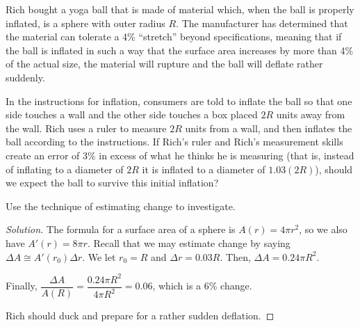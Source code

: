 \question Rich bought a yoga ball that is made of material which,
when the ball is properly inflated, is a sphere with outer radius $R$.
The manufacturer has determined that the material can tolerate a 4\% ``stretch'' beyond specifications,
meaning that if the ball is inflated in such a way that the surface area increases by more than 4\%
of the actual size, the material will rupture and the ball will deflate rather suddenly.

In the instructions for inflation, consumers are told to inflate the ball
so that one side touches a wall and the other side touches a box placed $2R$ units away from the wall.
Rich uses a ruler to measure $2R$ units from a wall, and then inflates the ball according to the instructions.
If Rich's ruler and Rich's measurement skills create an error of 3\% in excess of what he thinks he is measuring
(that is, instead of inflating to a diameter of $2R$ it is inflated to a diameter of $1.03(2R)$),
should we expect the ball to survive this initial inflation?

Use the technique of estimating change to investigate.

\begin{proof}[Solution]
  The formula for a surface area of a sphere is $A(r)=4\pi r^2$, so we also have $A'(r)=8\pi r$.
  Recall that we may estimate change by saying $\Delta A \cong A'(r_0) \Delta r$.
  We let $r_0=R$ and $\Delta r = 0.03R$.
  Then, $\Delta A = 0.24\pi R^2$.

  Finally, $\dfrac{\Delta A}{A(R)} = \dfrac{0.24\pi R^2}{4\pi R^2} = 0.06$, which is a 6\% change.

  Rich should duck and prepare for a rather sudden deflation.
\end{proof}


